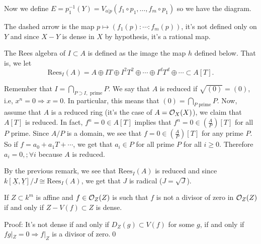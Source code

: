 Now we define $E=p_1^{-1}(Y)=V_{a|p}(f_1\circ p_1,\dots, f_m\circ p_1)$ so we have the diagram.
\begin{center}
\end{center}
The dashed arrow is the map $p\mapsto (f_1(p):\cdots:f_m(p))$, it's not defined only on $Y$ and since 
$X-Y$ is dense in $X$ by hypothesis, it's a rational map.
\begin{definition}
    The Rees algebra of $I\subset A$ is defined as the image the map $h$ defined below. That is, we let 
    \begin{equation}
        \text{Rees}_I(A) = A\oplus IT\oplus I^2T^2\oplus\cdots\oplus I^dT^d\oplus\cdots \subset A[T].
    \end{equation}
\end{definition}
\begin{remark}
    Remember that $I =\bigcap_{P\supset I,\text{ prime}}P$. We say that $A$ is reduced if $\sqrt{(0)}=(0)$, i.e, 
    $x^n=0\Rightarrow x=0$. In particular, this means that $(0)=\bigcap_{P\text{ prime}}P$. Now, assume that 
    $A$ is a reduced ring (it's the case of $A=\mathcal{O}_X(X)$), we claim that $A[T]$ is reduced. In fact, 
    $f^n=0\in A[T]$ implies that $f^n=0\in (\tfrac{A}{P})[T]$ for all $P$ prime. Since $A/P$ is a domain, we see that 
    $f=0\in (\tfrac{A}{P})[T]$ for any prime $P$. So if $f=a_0+a_1T+\cdots$, we get that $a_i\in P$ for all prime $P$ for all
    $i\geq0$. Therefore $a_i=0,;\forall i$ because $A$ is reduced.
\end{remark}

By the previous remark, we see that $\text{Rees}_I(A)$ is reduced and since $k[\underline{X},\underline{Y}]/J\cong\text{Rees}_I(A)$, 
we get that $J$ is radical ($J=\sqrt{J}$). 
\begin{dang}
    \begin{lemma}
        If $Z\subset k^m$ is affine and $f\in \mathcal{O}_Z(Z)$ is such that $f$ is not a divisor of zero in 
        $\mathcal{O}_Z(Z)$ if and only if $Z-V(f)\subset Z$ is dense.
    \end{lemma}
\end{dang}
Proof: It's not dense if and only if  
$D_Z(g)\subset V(f)$ for some $g$, if and only if $fg|_Z=0\Rightarrow f|_Z$ is a divisor of zero.\qed 

